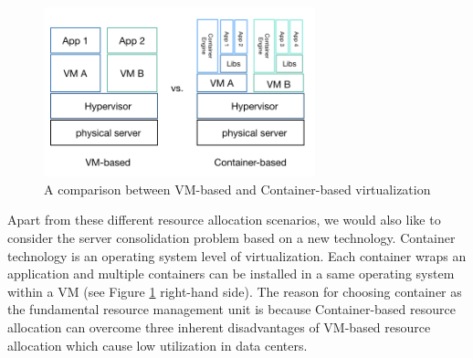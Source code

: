 \begin{figure}
	\centering
	\includegraphics[width=0.7\textwidth]{pics/comparison.png}
	\caption{A comparison between VM-based and Container-based virtualization}
	\label{fig:comparison}
\end{figure}

Apart from these different resource allocation scenarios, we would also like to consider the server consolidation problem based on a new technology. Container technology \cite{Soltesz:2007cu} is an operating system level of virtualization. Each container wraps an application and multiple containers can be installed in a same operating system within a VM (see Figure \ref{fig:comparison} right-hand side). The reason for choosing container as the fundamental resource management unit is because
Container-based resource allocation can overcome three inherent disadvantages of VM-based resource allocation which cause low utilization in data centers.

